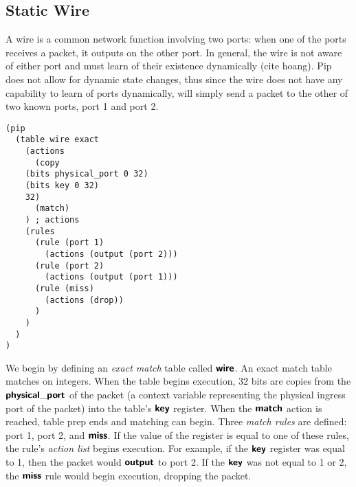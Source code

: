 \subsection{Static Wire}
\indent A wire is a common network function involving two ports: when one of the ports receives a packet, it outputs on the other port. In general, the wire is not aware of either port and must learn of their existence dynamically (cite hoang). Pip does not allow for dynamic state changes, thus since the wire does not have any capability to learn of ports dynamically, will simply send a packet to the other of two known ports, port 1 and port 2.
\begin{verbatim}
(pip
  (table wire exact
    (actions
      (copy
	(bits physical_port 0 32)
	(bits key 0 32)
	32)
      (match)
    ) ; actions
    (rules
      (rule (port 1)
        (actions (output (port 2)))
      (rule (port 2)
        (actions (output (port 1)))
      (rule (miss)
        (actions (drop))
      )
    )
  )
)
\end{verbatim}

We begin by defining an \textit{exact match} table called $\bm{\mathsf{{wire}}}$. An exact match table matches on integers. When the table begins execution, 32 bits are copies from the $\bm{\mathsf{{physical\_port}}}$ of the packet (a context variable representing the physical ingress port of the packet) into the table's $\bm{\mathsf{{key}}}$ register. When the $\bm{\mathsf{{match}}}$ action is reached, table prep ends and matching can begin. Three \textit{match rules} are defined: port 1, port 2, and $\bm{\mathsf{{miss}}}$. If the value of the  register is equal to one of these rules, the rule's \textit{action list} begins execution. For example, if the $\bm{\mathsf{{key}}}$ register was equal to 1, then the packet would $\bm{\mathsf{{output}}}$ to port 2. If the $\bm{\mathsf{{key}}}$ was not equal to 1 or 2, the $\bm{\mathsf{{miss}}}$ rule would begin execution, dropping the packet.

